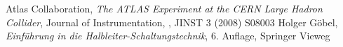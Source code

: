 \begin{thebibliography}{99}
 Atlas Collaboration, \textit{The {ATLAS} Experiment at the {CERN} Large Hadron Collider}, Journal of Instrumentation, , JINST 3 (2008) S08003
 Holger Göbel, \textit{Einführung in die Halbleiter-Schaltungstechnik}, 6. Auflage, Springer Vieweg 
\end{thebibliography}
